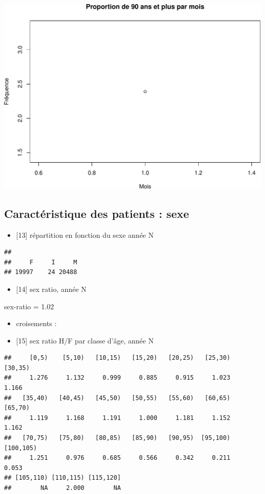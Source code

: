 \documentclass[]{article}
\begin{document}
\includegraphics{rapport_2014_files/figure-latex/age_extreme-4.pdf}

\subsection{Caractéristique des patients :
sexe}\label{caracteristique-des-patients-sexe}

\begin{itemize}
\itemsep1pt\parskip0pt
\item
  {[}13{]} répartition en fonction du sexe année N
\end{itemize}

\begin{verbatim}
## 
##     F     I     M 
## 19997    24 20488
\end{verbatim}

\begin{itemize}
\itemsep1pt\parskip0pt
\item
  {[}14{]} sex ratio, année N
\end{itemize}

sex-ratio = 1.02

\begin{itemize}
\item
  croisements :
\item
  {[}15{]} sex ratio H/F par classe d'âge, année N
\end{itemize}

\begin{verbatim}
##     [0,5)    [5,10)   [10,15)   [15,20)   [20,25)   [25,30)   [30,35) 
##     1.276     1.132     0.999     0.885     0.915     1.023     1.166 
##   [35,40)   [40,45)   [45,50)   [50,55)   [55,60)   [60,65)   [65,70) 
##     1.119     1.168     1.191     1.000     1.181     1.152     1.162 
##   [70,75)   [75,80)   [80,85)   [85,90)   [90,95)  [95,100) [100,105) 
##     1.251     0.976     0.685     0.566     0.342     0.211     0.053 
## [105,110) [110,115) [115,120] 
##        NA     2.000        NA
\end{verbatim}
\end{document}
